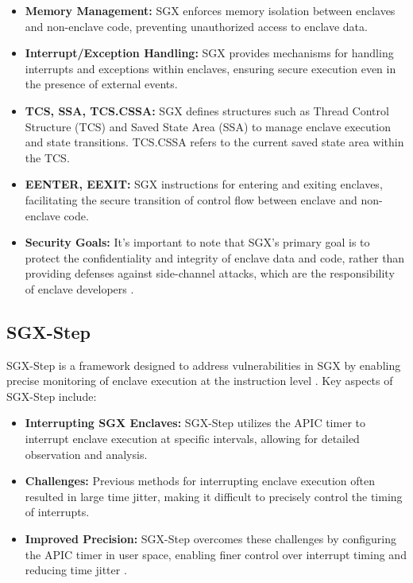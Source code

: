\documentclass{llncs}
\begin{document}
\begin{itemize}
    \item \textbf{Memory Management:} SGX enforces memory isolation between enclaves and non-enclave code, preventing unauthorized access to enclave data.
    \item \textbf{Interrupt/Exception Handling:} SGX provides mechanisms for handling interrupts and exceptions within enclaves, ensuring secure execution even in the presence of external events.
    \item \textbf{TCS, SSA, TCS.CSSA:} SGX defines structures such as Thread Control Structure (TCS) and Saved State Area (SSA) to manage enclave execution and state transitions. TCS.CSSA refers to the current saved state area within the TCS.
    \item \textbf{EENTER, EEXIT:} SGX instructions for entering and exiting enclaves, facilitating the secure transition of control flow between enclave and non-enclave code.
    \item \textbf{Security Goals:} It's important to note that SGX's primary goal is to protect the confidentiality and integrity of enclave data and code, rather than providing defenses against side-channel attacks, which are the responsibility of enclave developers \cite{CostanD16}.
\end{itemize}

\subsection{SGX-Step}

SGX-Step is a framework designed to address vulnerabilities in SGX by enabling precise monitoring of enclave execution at the instruction level \cite{ArnautovTGKMPLM16}. Key aspects of SGX-Step include:

\begin{itemize}
    \item \textbf{Interrupting SGX Enclaves:} SGX-Step utilizes the APIC timer to interrupt enclave execution at specific intervals, allowing for detailed observation and analysis.
    \item \textbf{Challenges:} Previous methods for interrupting enclave execution often resulted in large time jitter, making it difficult to precisely control the timing of interrupts.
    \item \textbf{Improved Precision:} SGX-Step overcomes these challenges by configuring the APIC timer in user space, enabling finer control over interrupt timing and reducing time jitter \cite{ArnautovTGKMPLM16}.
\end{itemize}
\end{document}
